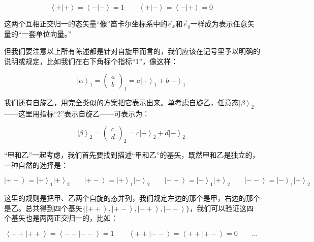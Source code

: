 \begin{equation}
\left\langle + | + \right\rangle = \left\langle - | - \right\rangle  = 1 \qquad
\left\langle + | - \right\rangle = \left\langle - | + \right\rangle = 0~
\end{equation}

这两个互相正交归一的态矢量“像”笛卡尔坐标系中的$\vec e_x$和$\vec e_y$一样成为表示任意矢量的“一套单位向量。”

但我们要注意以上所有陈述都是针对自旋甲而言的，我们应该在记号里予以明确的说明或规定，比如我们在右下角标个指标“1”，像这样：

\begin{equation}
\left| \alpha \right\rangle_1 = \left( \begin{array}{ccc} a \\ b \end{array} \right)_1 = a \left| + \right\rangle_1 + b \left| - \right\rangle_1~
\end{equation}

我们还有自旋乙，用完全类似的方案把它表示出来。单考虑自旋乙，任意态$\left| \beta \right\rangle_2$——这里用指标“2”表示自旋乙——可表示为：

\begin{equation}
\left| \beta \right\rangle_2 = \left( \begin{array}{ccc} c \\ d \end{array} \right)_2 = c \left| + \right\rangle_2 + d \left| - \right\rangle_2~
\end{equation}

“甲和乙”一起考虑，我们首先要找到描述“甲和乙”的基矢，既然甲和乙是独立的，一种自然的选择是：

\begin{equation}
\left| ++ \right\rangle  =  \left| + \right\rangle_1 \left| + \right\rangle_2\qquad
\left| +- \right\rangle  =  \left| + \right\rangle_1 \left| - \right\rangle_2\qquad
\left| -+ \right\rangle  =  \left| - \right\rangle_1 \left| + \right\rangle_2\qquad
\left| -- \right\rangle  =  \left| - \right\rangle_1 \left| - \right\rangle_2 ~
\end{equation}

这里的规则是把甲、乙两个自旋的态并列，我们规定左边的那个是甲，右边的那个是乙。总共得到四个基矢$\{ \left| ++ \right\rangle, \left| +- \right\rangle, \left| -+ \right\rangle, \left| - - \right\rangle \}$，我们可以验证这四个基矢也是两两正交归一的，比如：

\begin{equation}
\left\langle ++ | ++ \right\rangle = \left\langle -- | -- \right\rangle = 1 \qquad
\left\langle ++ | -- \right\rangle = \left\langle ++ | +- \right\rangle = 0 \qquad
{}  ...  {}~
\end{equation}

